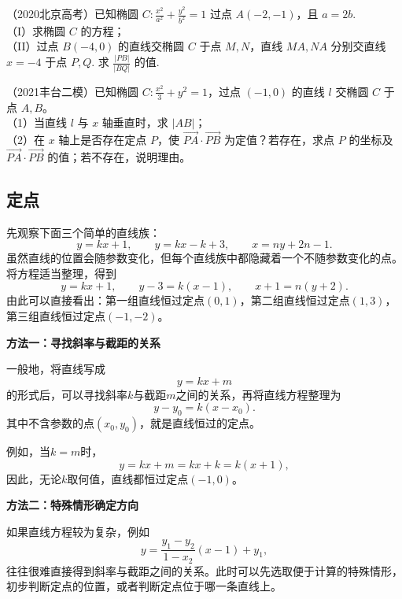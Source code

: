 \begin{example} 
（2020北京高考）已知椭圆 $C:\frac{x^2}{a^2}+\frac{y^2}{b^2}=1$ 过点 $A(-2,-1)$，且 $a=2b$.\\
（I）求椭圆 $C$ 的方程；\\
（II）过点 $B(-4,0)$ 的直线交椭圆 $C$ 于点 $M,N$，直线 $MA,NA$ 分别交直线 $x=-4$ 于点 $P,Q$. 求 $\frac{\lvert PB\rvert}{\lvert BQ\rvert}$ 的值.
\end{example}
\begin{example} %
（2021丰台二模）已知椭圆 $C:\frac{x^2}{3}+y^2=1$，过点 $(-1,0)$ 的直线 $l$ 交椭圆 $C$ 于点 $A,B$。\\
（1）当直线 $l$ 与 $x$ 轴垂直时，求 $\lvert AB\rvert$；\\
（2）在 $x$ 轴上是否存在定点 $P$，使 $\overrightarrow{PA}\cdot\overrightarrow{PB}$ 为定值？若存在，求点 $P$ 的坐标及 $\overrightarrow{PA}\cdot\overrightarrow{PB}$ 的值；若不存在，说明理由。
\end{example}







\subsection{定点}

\medskip
{}


先观察下面三个简单的直线族：
\[
y=kx+1,\qquad
y=kx-k+3,\qquad
x=ny+2n-1.
\]
虽然直线的位置会随参数变化，但每个直线族中都隐藏着一个不随参数变化的点。将方程适当整理，得到
\[
y=kx+1,\qquad
y-3=k(x-1),\qquad
x+1=n(y+2).
\]
由此可以直接看出：第一组直线恒过定点$(0,1)$，第二组直线恒过定点$(1,3)$，第三组直线恒过定点$(-1,-2)$。

\textbf{方法一：寻找斜率与截距的关系}

一般地，将直线写成
\[
y=kx+m
\]
的形式后，可以寻找斜率$k$与截距$m$之间的关系，再将直线方程整理为
\[
y-y_0=k(x-x_0).
\]
其中不含参数的点$(x_0,y_0)$，就是直线恒过的定点。

例如，当$k=m$时，
\[
y=kx+m=kx+k=k(x+1),
\]
因此，无论$k$取何值，直线都恒过定点$(-1,0)$。

\textbf{方法二：特殊情形确定方向}


如果直线方程较为复杂，例如
\[
y=\frac{y_1-y_2}{1-x_2}(x-1)+y_1,
\]
往往很难直接得到斜率与截距之间的关系。此时可以先选取便于计算的特殊情形，初步判断定点的位置，或者判断定点位于哪一条直线上。

